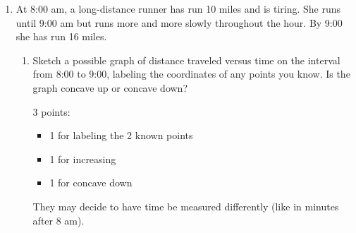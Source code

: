 \documentclass{article}
\begin{document}
\begin{enumerate}
\begin{enumerate}
    \begin{grading}
      1 point
    \end{grading}

    \begin{problem}[\newpage]
      Which 2 of the 4 quantities in (a) are the best approximation for $f'(2)$? No explanation is necessary.
    \end{problem}

    \begin{solution}
      $\dfrac{f(2 + h) - f(2)}{h}$, where $h = -0.2$ and $\dfrac{f(x) - f(2)}{x - 2}$, where $x = 1.8$
      are the best approximation for $f'(2)$.
    \end{solution}

  \end{enumerate}

\item \label{gottlieb-4-4-11} %
  At 8:00 am, a long-distance runner has run 10 miles and is tiring. She runs until 9:00 am but runs more and more slowly throughout the hour. By 9:00 she has run 16 miles.

  \begin{enumerate}
  \item
    \begin{problem}[\vfill]
      Sketch a possible graph of distance traveled versus time on the interval from 8:00 to 9:00, labeling the coordinates of any points you know. Is the graph concave up or concave down? 
    \end{problem}

    \begin{grading} 
      3 points:
      \begin{itemize}[nosep]
      \item 1 for labeling the 2 known points
      \item 1 for increasing
      \item 1 for concave down
      \end{itemize}
      They may decide to have time be measured differently (like in minutes after 8 am).
    \end{grading} 


\end{enumerate}
\end{enumerate}
\end{document}
